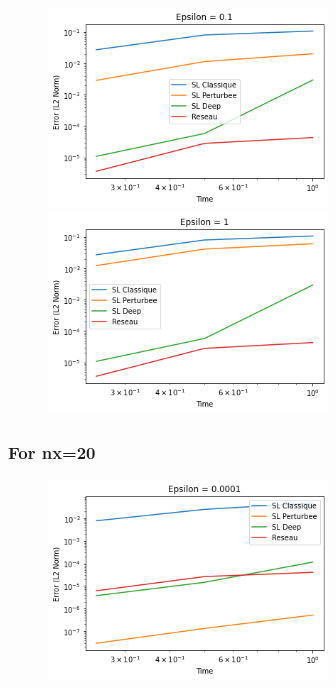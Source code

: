 \documentclass{article}
\begin{document}
\newpage
\begin{figure}[!h]
    \centering
    \includegraphics[width=0.66\textwidth]{images/10ep14.png}
    \includegraphics[width=0.66\textwidth]{images/10ep15.png}
\end{figure}
\subsubsection*{For nx=20}

\begin{figure}[!h]
    \centering

    \includegraphics[width=0.66\textwidth]{images/20ep11.png}
\end{figure}
\end{document}
